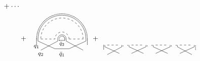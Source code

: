 \documentclass[aps,pra,reprint,superscriptaddress,twocolumn,notitlepage]{revtex4-1}
\numberwithin{equation}{section}
\begin{document}
\begin{widetext}
\begin{equation}
\begin{aligned}
{ }
 \ \,
+
\cdots
 \\
&+ 
\ \,
\tikz[scale=0.7,baseline=-0.5ex]{
    \draw[dashed] (0,0) -- (1,0);
    \draw (-0.2,0.)-- (-0.2,-0.15);
    \draw (-0.2,-0.15)-- (1.,-0.7);
    \draw (1.2,-0.15)-- (1.2,0.0);
    \draw (1.2,-0.15)-- (0,-0.8);
    \draw[densely dotted,thick] (-0.3,0.)-- (-0.3,-0.4);
    \draw[densely dotted,thick] (1.3,-0.1)-- (1.3,0.);
    \draw[dashed] (2,0) -- (3,0);
    \draw (1.8,0.)-- (1.8,-0.15);
    \draw (1.8,-0.15)-- (3.,-0.8);
    \draw (3.2,-0.15)-- (3.2,0.);
    \draw (3.2,-0.15)-- (2,-0.7);
    \draw[densely dotted,thick] (1.7,0.)-- (1.7,-0.1);
    \draw[densely dotted,thick] (3.3,-0.4)-- (3.3,0.);
    \draw[densely dotted,thick] (1.3,-0.1)--(1.7,-0.1);
    \draw (1.0,-0.7)-- (2,-0.7);
    \draw[densely dotted,thick] (3.3,0) arc (0:180:1.8);
    \draw[densely dotted,thick] (1.7,0) arc (0:180:0.2);
    \draw[dashed] (2.0,0) arc (0:180:0.5);
    \draw[dashed] (3.0,0) arc (0:180:1.5);
    \draw (1.8,0) arc (0:180:0.3);
    \draw (3.2,0) arc (0:180:1.7);
    \draw (-0.,-1.1) circle (0.) node[anchor=center] {\footnotesize$q_2$};
    \draw (-0.3,-0.55) circle (0.) node[anchor=center] {\footnotesize$q_1$};
    \draw (1.5,-1.1) circle (0.) node[anchor=center] {\footnotesize$\bar{q}_1$};
    \draw (1.5,-0.35) circle (0.) node[anchor=center] {\scriptsize$\bar{q}_2$};
 }
\ \,
+ 
 \ \,
 \tikz[scale=0.6,baseline=1.5ex]{
    \draw[dashed] (0,0) -- (1,0);
    \draw (-0.2,0.)-- (-0.2,-0.15);
    \draw (-0.2,-0.15)-- (1.,-0.7);
    \draw (1.2,-0.15)-- (1.2,0.0);
    \draw (1.2,-0.15)-- (0,-0.8);
    \draw[densely dotted,thick] (-0.3,0.)-- (-0.3,-0.4);
    \draw[densely dotted,thick] (1.3,-0.1)-- (1.3,0.);
    \draw[dashed] (2,0) -- (3,0);
    \draw (1.8,0.)-- (1.8,-0.15);
    \draw (1.8,-0.15)-- (3.,-0.7);
    \draw (3.2,-0.15)-- (3.2,0.);
    \draw (3.2,-0.15)-- (2,-0.7);
    \draw[densely dotted,thick] (1.7,0.)-- (1.7,-0.1);
    \draw[densely dotted,thick] (3.3,-0.1)-- (3.3,0.);
    \draw[dashed] (4,0) -- (5,0);
    \draw (3.8,0.)-- (3.8,-0.15);
    \draw (3.8,-0.15)-- (5.,-0.7);
    \draw (5.2,-0.15)-- (5.2,0.);
    \draw (5.2,-0.15)-- (4,-0.7);
    \draw[densely dotted,thick] (3.7,0.)-- (3.7,-0.1);
    \draw[densely dotted,thick] (5.3,-0.1)-- (5.3,0.);
    \draw[dashed] (6,0) -- (7,0);
    \draw (5.8,0.)-- (5.8,-0.15);
    \draw (5.8,-0.15)-- (7.,-0.8);
    \draw (7.2,-0.15)-- (7.2,0.);
    \draw (7.2,-0.15)-- (6,-0.7);
    \draw[densely dotted,thick] (5.7,0.)-- (5.7,-0.1);
    \draw[densely dotted,thick] (7.3,-0.4)-- (7.3,0.);
}
\end{aligned}
\end{equation}
\end{widetext}
\end{document}
